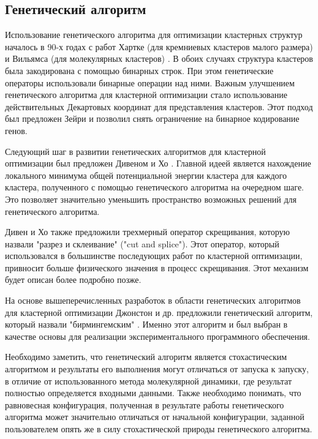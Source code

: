 \subsection{Генетический алгоритм}
\label{sec:1c}

Использование генетического алгоритма для оптимизации кластерных структур
началось в 90-х годах с работ Хартке (для кремниевых кластеров малого размера)
\cite{Hartke1993} и Вильямса (для молекулярных кластеров) \cite{Xiao1993}. В обоих
случаях структура кластеров была закодирована с помощью бинарных строк. При этом
генетические операторы использовали бинарные операции над ними. Важным улучшением
генетического алгоритма для кластерной оптимизации стало использование действительных
Декартовых координат для представления кластеров. Этот подход был предложен
Зейри \cite{Zeiri1995} и позволил снять ограничение на бинарное кодирование генов.

Следующий шаг в развитии генетических алгоритмов для кластерной оптимизации был
предложен Дивеном и Хо \cite{Deaven1995}. Главной идеей является нахождение локального
минимума общей потенциальной энергии кластера для каждого кластера, полученного
с помощью генетического алгоритма на очередном шаге. Это позволяет значительно
уменьшить пространство возможных решений для генетического алгоритма.

Дивен и Хо также предложили трехмерный оператор скрещивания, которую назвали
"разрез и склеивание" ("cut and splice"). Этот оператор, который использовался
в большинстве последующих работ по кластерной оптимизации, привносит больше 
физического значения в процесс скрещивания. Этот механизм будет описан более
подробно позже.

На основе вышеперечисленных разработок в области генетических алгоритмов для
кластерной оптимизации Джонстон и др. предложили генетический алгоритм,
который назвали "бирмингемским" \cite{Johnston2002}. Именно этот алгоритм и был
выбран в качестве основы для реализации экспериментального программного обеспечения.

Необходимо заметить, что генетический алгоритм является стохастическим алгоритмом
и результаты его выполнения могут отличаться от запуска к запуску, в отличие от
использованного метода молекулярной динамики, где результат полностью определяется
входными данными. Также необходимо понимать, что равновесная конфигурация, полученная
в результате работы генетического алгоритма может значительно отличаться от начальной
конфигурации, заданной пользователем опять же в силу стохастической природы генетического
алгоритма.

